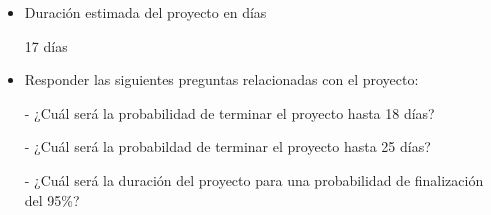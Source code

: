 \documentclass[12pt]{article}
\begin{document}
\begin{itemize}
    \item Duración estimada del proyecto en días

    17 días

    \item Responder las siguientes preguntas relacionadas con el proyecto:

    - ¿Cuál será la probabilidad de terminar el proyecto hasta 18 días?

    - ¿Cuál será la probabildad de terminar el proyecto hasta 25 días?

- ¿Cuál será la duración del proyecto para una probabilidad de finalización del
95\%?
    
\end{itemize}
\end{document}
